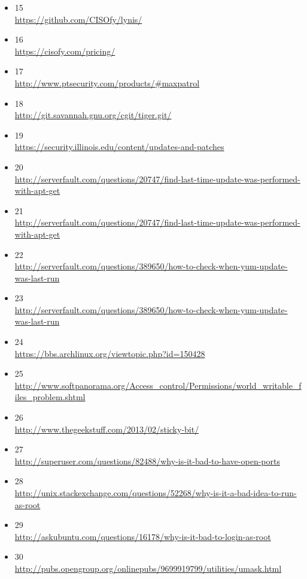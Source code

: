 \documentclass[a4paper,12pt]{article}
\begin{document}
\begin{sloppypar}
\begin{itemize}
\item 15 \\ 
	\url{https://github.com/CISOfy/lynis/}
\item 16 \\ 
	\url{https://cisofy.com/pricing/}
\item 17 \\ 
	\url{http://www.ptsecurity.com/products/#maxpatrol}
\item 18 \\ 
	\url{http://git.savannah.gnu.org/cgit/tiger.git/}
\item 19 \\ 
	\url{https://security.illinois.edu/content/updates-and-patches}
\item 20 \\ 
	\url{http://serverfault.com/questions/20747/find-last-time-update-was-performed-with-apt-get}
\item 21 \\ 
	\url{http://serverfault.com/questions/20747/find-last-time-update-was-performed-with-apt-get}
\item 22 \\ 
	\url{http://serverfault.com/questions/389650/how-to-check-when-yum-update-was-last-run}
\item 23 \\ 
	\url{http://serverfault.com/questions/389650/how-to-check-when-yum-update-was-last-run}
\item 24 \\ 
	\url{https://bbs.archlinux.org/viewtopic.php?id=150428}
\item 25 \\ 
	\url{http://www.softpanorama.org/Access\_control/Permissions/world\_writable\_files\_problem.shtml}
\item 26 \\ 
	\url{http://www.thegeekstuff.com/2013/02/sticky-bit/}
\item 27 \\ 
	\url{http://superuser.com/questions/82488/why-is-it-bad-to-have-open-ports}
\item 28 \\ 
	\url{http://unix.stackexchange.com/questions/52268/why-is-it-a-bad-idea-to-run-as-root}
\item 29 \\ 
	\url{http://askubuntu.com/questions/16178/why-is-it-bad-to-login-as-root}
\item 30 \\ 
	\url{http://pubs.opengroup.org/onlinepubs/9699919799/utilities/umask.html}

\end{itemize}
\end{sloppypar}
\end{document}
